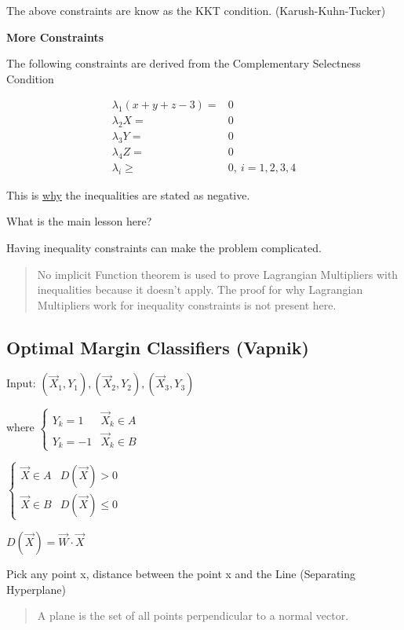 \documentclass[11pt]{article}
\begin{document}
The above constraints are know as the KKT condition. (Karush-Kuhn-Tucker)

\textbf{More Constraints}

The following constraints are derived from the Complementary Selectness Condition

\begin{equation}
\begin{split}
\lambda_1(x + y + z - 3) = & 0\\
\lambda_2 X = & 0\\
\lambda_3 Y = & 0\\
\lambda_4 Z = & 0\\
\lambda_i \geq & 0, \ i = 1,2,3,4
\end{split}
\end{equation}

This is \uline{why} the inequalities are stated as negative.

What is the main lesson here?

Having inequality constraints can make the problem complicated.

\begin{quote}
No implicit Function theorem is used to prove Lagrangian Multipliers with
inequalities because it doesn't apply. The proof for why Lagrangian Multipliers
work for inequality constraints is not present here.
\end{quote}
\subsection{Optimal Margin Classifiers (Vapnik)}
\label{sec:orgfeffbb2}


Input: \((\vec X_1, Y_1),(\vec X_2, Y_2),(\vec X_3, Y_3)\)

where \(\begin{cases} Y_k = 1 & \vec X_k \in A\\ Y_k = -1 & \vec X_k \in B \end{cases}\)

\(\begin{cases} \vec X \in A & D(\vec X) > 0\\ \vec X \in B & D(\vec X) \leq 0 \end{cases}\)

\(D(\vec X) = \vec W \cdot \vec X\)

Pick any point x, distance between the point x and the Line (Separating
Hyperplane)

\begin{quote}
A plane is the set of all points perpendicular to a normal vector.
\end{quote}
\end{document}
